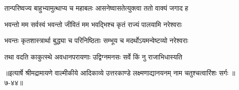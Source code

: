 \twolineshloka
{तान्परिष्वज्य बाहुभ्यामुत्थाप्य च महाबलः}
{आसनेष्वासतेत्युक्त्वा ततो वाक्यं जगाद ह} %

\twolineshloka
{भवन्तो मम सर्वस्वं भवन्तो जीवितं मम}
{भवद्भिश्च कृतं राज्यं पालयामि नरेश्वराः} %

\twolineshloka
{भवन्तः कृतशास्त्रार्था बुद्ध्या च परिनिष्ठिताः}
{सम्भूय च मदर्थोऽयमन्वेष्टव्यो नरेश्वराः} %

\twolineshloka
{तथा वदति काकुत्स्थे अवधानपरायणाः}
{उद्विग्नमनसः सर्वे किं नु राजाभिधास्यति} %


॥इत्यार्षे श्रीमद्रामायणे वाल्मीकीये आदिकाव्ये उत्तरकाण्डे लक्ष्मणाद्यानयनम् नाम चतुश्चत्वारिंशः सर्गः ॥७-४४॥

